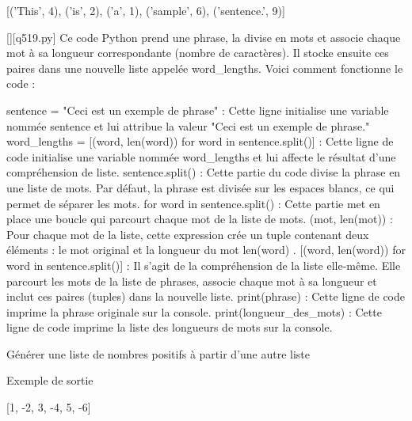 [('This', 4), ('is', 2), ('a', 1), ('sample', 6), ('sentence.', 9)]
        \par
        \begin{solution}
            \renewcommand{\nomfichier}{q519.py}
            \pythonfile{\chemincode \nomfichier}[][\nomfichier]
            Ce code Python prend une phrase, la divise en mots et associe chaque mot à sa longueur correspondante (nombre de caractères). Il stocke ensuite ces paires dans une nouvelle liste appelée word\_lengths. Voici comment fonctionne le code :

    sentence = "Ceci est un exemple de phrase" : Cette ligne initialise une variable nommée sentence et lui attribue la valeur "Ceci est un exemple de phrase."
    word\_lengths = [(word, len(word)) for word in sentence.split()] : Cette ligne de code initialise une variable nommée word\_lengths et lui affecte le résultat d'une compréhension de liste.
        sentence.split() : Cette partie du code divise la phrase en une liste de mots. Par défaut, la phrase est divisée sur les espaces blancs, ce qui permet de séparer les mots.
        for word in sentence.split() : Cette partie met en place une boucle qui parcourt chaque mot de la liste de mots.
        (mot, len(mot)) : Pour chaque mot de la liste, cette expression crée un tuple contenant deux éléments : le mot original et la longueur du mot len(word) .
        [(word, len(word)) for word in sentence.split()] : Il s'agit de la compréhension de la liste elle-même. Elle parcourt les mots de la liste de phrases, associe chaque mot à sa longueur et inclut ces paires (tuples) dans la nouvelle liste.
    print(phrase) : Cette ligne de code imprime la phrase originale sur la console.
    print(longueur\_des\_mots) : Cette ligne de code imprime la liste des longueurs de mots sur la console.
        \end{solution}
        

        \question
        Générer une liste de nombres positifs à partir d'une autre liste

Exemple de sortie

[1, -2, 3, -4, 5, -6]

